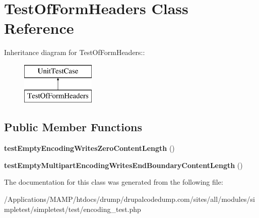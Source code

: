 \hypertarget{class_test_of_form_headers}{
\section{TestOfFormHeaders Class Reference}
\label{class_test_of_form_headers}
}
Inheritance diagram for TestOfFormHeaders::\begin{figure}[H]
\begin{center}
\leavevmode
\includegraphics[height=2cm]{class_test_of_form_headers}
\end{center}
\end{figure}
\subsection*{Public Member Functions}
\begin{DoxyCompactItemize}
\item 
\hypertarget{class_test_of_form_headers_aa26689e25f77c904a0d5254967161830}{
{\bfseries testEmptyEncodingWritesZeroContentLength} ()}
\label{class_test_of_form_headers_aa26689e25f77c904a0d5254967161830}

\item 
\hypertarget{class_test_of_form_headers_ad70728956c11f4e73c595bd7d939954a}{
{\bfseries testEmptyMultipartEncodingWritesEndBoundaryContentLength} ()}
\label{class_test_of_form_headers_ad70728956c11f4e73c595bd7d939954a}

\end{DoxyCompactItemize}


The documentation for this class was generated from the following file:\begin{DoxyCompactItemize}
\item 
/Applications/MAMP/htdocs/drump/drupalcodedump.com/sites/all/modules/simpletest/simpletest/test/encoding\_\-test.php\end{DoxyCompactItemize}
